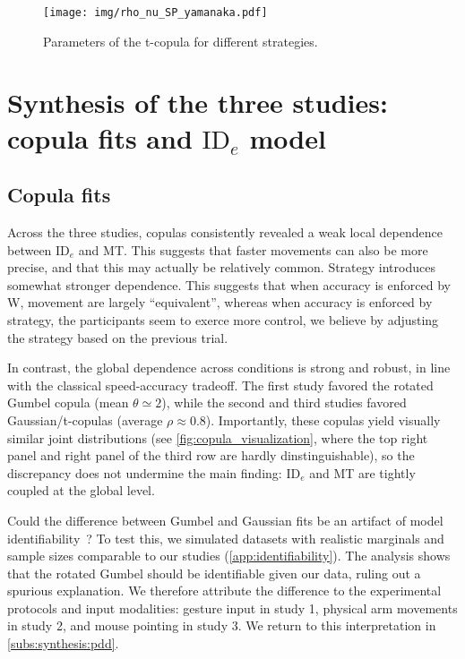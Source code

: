 \documentclass[acmlarge, manuscript,review]{acmart}
\newcommand{\ide}{\ensuremath{{\text{ID}_e}}\xspace}
\begin{document}
\begin{figure}[htbp]
	\centering
	\texttt{[image: img/rho\_nu\_SP\_yamanaka.pdf]}
	\caption{Parameters of the t-copula for different strategies.}
	\label{fig:rho_nu}
\end{figure}


\section{Synthesis of the three studies: copula fits and \ide model}


\subsection{Copula fits}
Across the three studies, copulas consistently revealed a weak local dependence between \ide and MT. This suggests that faster movements can also be more precise, and that this may actually be relatively common. Strategy introduces somewhat stronger dependence. This suggests that when accuracy is enforced by W, movement are largely ``equivalent'', whereas when accuracy is enforced by strategy, the participants seem to exerce more control, we believe \eg by adjusting the strategy based on the previous trial.

In contrast, the global dependence across conditions is strong and robust, in line with the classical speed-accuracy tradeoff. The first study favored the rotated Gumbel copula (mean $\theta \simeq 2$), while the second and third studies favored Gaussian/t-copulas (average $\rho \approx 0.8$). Importantly, these copulas yield visually similar joint distributions (see \autoref{fig:copula_visualization}, where the top right panel and right panel of the third row are hardly dinstinguishable), so the discrepancy does not undermine the main finding: \ide and MT are tightly coupled at the global level.

Could the difference between Gumbel and Gaussian fits be an artifact of model identifiability~\cite{gori2024, wilson2019}? To test this, we simulated datasets with realistic marginals and sample sizes comparable to our studies (\autoref{app:identifiability}). The analysis shows that the rotated Gumbel should be identifiable given our data, ruling out a spurious explanation. We therefore attribute the difference to the experimental protocols and input modalities: gesture input in study 1, physical arm movements in study 2, and mouse pointing in study 3. We return to this interpretation in \autoref{subs:synthesis:pdd}.
\end{document}
